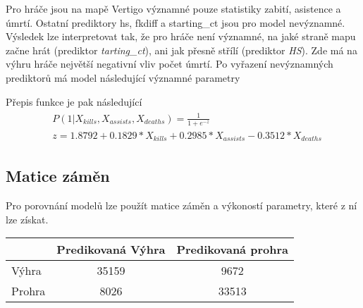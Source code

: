 Pro hráče jsou na mapě Vertigo významné pouze statistiky zabití, asistence a úmrtí. Ostatní prediktory hs, fkdiff a starting\_ct jsou pro model nevýznamné. Výsledek lze 
interpretovat tak, že pro hráče není významné, na jaké straně mapu začne hrát (prediktor  \textit{tarting\_ct}), ani jak přesně střílí (prediktor \textit{HS}).
Zde má na výhru hráče největší negativní vliv počet úmrtí. Po vyřazení nevýznamných prediktorů má model následující významné parametry



Přepis funkce je pak následující
\begin{align}
    \begin{split}
        &P(1 | X_{kills}, X_{assists}, X_{deaths}) = \frac{1}{1 + e^{-z}} \\
        &z = 1.8792 + 0.1829*X_{kills} + 0.2985*X_{assists} - 0.3512*X_{deaths}
    \end{split}
\end{align}

\subsection{Matice záměn}
Pro porovnání modelů lze použít matice záměn a výkoností parametry, které z ní lze získat.

\begin{tabular}[t]{l|c|c}
    \hline
      & Predikovaná Výhra & Predikovaná prohra\\
    \hline
    Výhra & 35159 & 9672\\
    \hline
    Prohra & 8026 & 33513\\
    \hline
    \end{tabular}
